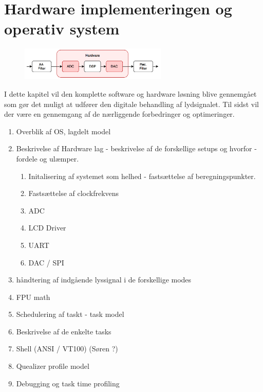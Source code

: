 \chapter{Hardware implementeringen og operativ system}\label{kap:hardware}

\begin{figure}[h]
	\vspace*{-1 cm}
	\includegraphics[width=7cm]{billeder/flow_hardware}
	\vspace{0.5 cm}
\end{figure}

I dette kapitel vil den komplette software og hardware løsning blive gennemgået som gør det muligt at udfører den digitale behandling af lydsignalet.
Til sidst vil der være en gennemgang af de nærliggende forbedringer og optimeringer.


\begin{enumerate}
	\item Overblik af OS, lagdelt model
	\item Beskrivelse af Hardware lag - beskrivelse af de forskellige setups og hvorfor - fordele og ulæmper.
	\begin{enumerate}
		\item Initalisering af systemet som helhed - fastsættelse af beregningspunkter.
		\item Fastsættelse af clockfrekvens
		\item ADC
		\item LCD Driver 
		\item UART
		\item DAC / SPI
	\end{enumerate}
	\item håndtering af indgående lyssignal i de forskellige modes
	\item FPU math
	\item Schedulering af taskt - task model 
	\item Beskrivelse af de enkelte tasks
	\item Shell (ANSI / VT100) (Søren ?) 
	\item Quealizer profile model
	\item Debugging og task time profiling
	
\end{enumerate}






